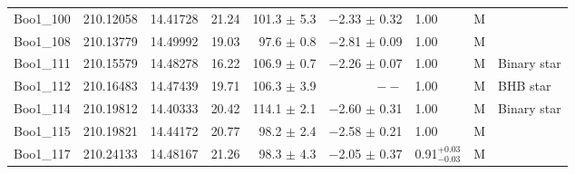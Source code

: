 \begin{table*}[t]
\begin{tabular}{lllrrrlcl}
Boo1\_100 & 210.12058 & 14.41728 & 21.24 & 101.3  $\pm$ 5.3 & $-$2.33  $\pm$ 0.32 & 1.00 & M & \\ 
Boo1\_108 & 210.13779 & 14.49992 & 19.03 & 97.6  $\pm$ 0.8 & $-$2.81  $\pm$ 0.09 & 1.00 & M & \\ 
Boo1\_111 & 210.15579 & 14.48278 & 16.22 & 106.9  $\pm$ 0.7 & $-$2.26  $\pm$ 0.07 & 1.00 & M & Binary star\\ 
Boo1\_112 & 210.16483 & 14.47439 & 19.71 & 106.3  $\pm$ 3.9 & $--$  & 1.00 & M & BHB star\\ 
Boo1\_114 & 210.19812 & 14.40333 & 20.42 & 114.1  $\pm$ 2.1 & $-$2.60  $\pm$ 0.31 & 1.00 & M & Binary star\\ 
Boo1\_115 & 210.19821 & 14.44172 & 20.77 & 98.2  $\pm$ 2.4 & $-$2.58  $\pm$ 0.21 & 1.00 & M & \\ 
Boo1\_117 & 210.24133 & 14.48167 & 21.26 & 98.3  $\pm$ 4.3 & $-$2.05  $\pm$ 0.37 & 0.91$^{+0.03}_{-0.03}$ & M & \\  
\hline
\end{tabular}
\end{table*}
